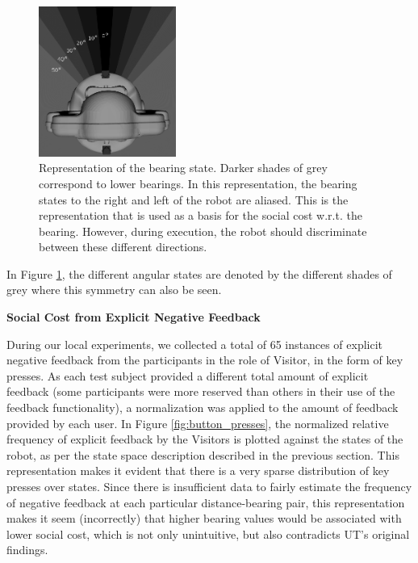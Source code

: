 \documentclass[a4paper,11pt]{report}
\begin{document}
\begin{figure}
    \centering
    \includegraphics[width=0.4\textwidth]{figures/state_viz.png}
    \caption{Representation of the bearing state. Darker shades of grey correspond to lower bearings. In this representation, the bearing states to the right and left of the robot are aliased. This is the representation that is used as a basis for the social cost w.r.t. the bearing. However, during execution, the robot should discriminate between these different directions.}
    	\label{fig:state_viz}
\end{figure}

In Figure \ref{fig:state_viz}, the different angular states are denoted by the different shades of grey where this symmetry can also be seen.

{\bf Social Cost from Explicit Negative Feedback}

During our local experiments, we collected a total of 65 instances of explicit negative feedback from the participants in the role of Visitor, in the form of key presses. As each test subject provided a different total amount of explicit feedback (some participants were more reserved than others in their use of the feedback functionality), a normalization was applied to the amount of feedback provided by each user. In Figure \ref{fig:button_presses}, the normalized relative frequency of explicit feedback by the Visitors is plotted against the states of the robot, as per the state space description described in the previous section. This representation makes it evident that there is a very sparse distribution of key presses over states. Since there is insufficient data to fairly estimate the frequency of negative feedback at each particular distance-bearing pair, this representation makes it seem (incorrectly) that higher bearing values would be associated with lower social cost, which is not only unintuitive, but also contradicts UT's original findings.

\end{document}

